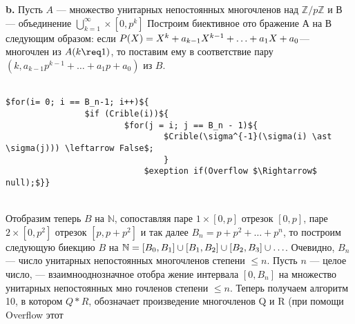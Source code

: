 \documentclass{../../template/mai_book}
\begin{document}
{\begin{wrapfigure}{r}{0.5\textwidth}
\begin{lstlisting}
\end{lstlisting}
\end{wrapfigure}
\newpage
\hspace*{15pt}\textbf{b.} Пусть $A$ — множество унитарных непостоянных многочленов над\linebreak
$\mathbb{Z}/p\mathbb{Z}$ и В — объединение  $\bigcup^{\infty}_{k=1} \times [0, p^{k}]$ Построим биективное ото­\linebreak
бражение А на В следующим образом: если $P(X) = X^{k} + a_{k-1}X^{k-1} +\linebreak
\ldots +a_1X + a_0 $---  многочлен из $A(k \req 1)$,  то поставим ему в соответствие\linebreak
пару  $(k,a_{k-1}p^{k-1}+\ldots+a_{1}p + a_0)$ из $B$.\\
\\
\begin{lstlisting}[mathescape = true, caption = {Решето Эратосфена}]
		$for(i= 0; i == B_n-1; i++)${
				$if (Crible(i))${
						$for(j = i; j == B_n - 1)${
								$Crible(\sigma^{-1}(\sigma(i) \ast \sigma(j))) \leftarrow False$;
								}
							$exeption if(Overflow $\Rightarrow$ null);$}}
\end{lstlisting}
\\
Отобразим теперь $B$ на $\mathbb{N}$, сопоставляя паре ${1} \times [0, p]$ отрезок $[0, p]$,\linebreak
паре ${2} \times [0, p^{2}]$  отрезок $[p, p + p^{2}]$  и так далее $B_n = p + p^{2} + \ldots +p^{n}$,\linebreak
то построим следующую биекцию $B$ на $\mathbb{N} = [B_0, B_1]\cup [B_1, B_2] \cup [B_2, \linebreak
B_3] \cup \ldots$. Очевидно, $B_n$ --- число унитарных непостоянных многочленов\linebreak
степени $ \leq n$. Пусть $n$ — целое число, \sigma --- взаимнооднозначное отобра­\linebreak
жение интервала $[0, B_n]$ на множество унитарных непостоянных мно­\linebreak
гочленов степени $\leq n$. Теперь получаем алгоритм 10, в котором $Q * R$,\linebreak
обозначает произведение многочленов Q и R (при помощи Overflow этот \linebreak
}
\end{document}
